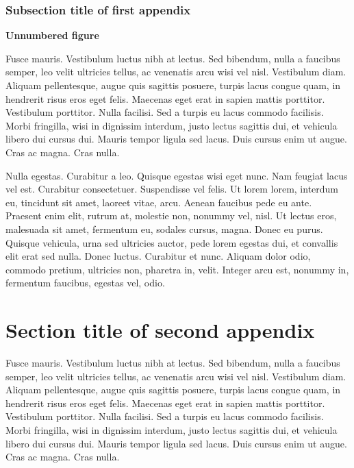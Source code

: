\documentclass[AMA]{WileyNJD-v1}
\begin{document}
\subsubsection{Subsection title of first appendix\label{app1.1.1a}}

\noindent\textbf{Unnumbered figure}


\begin{center}
\end{center}


Fusce mauris. Vestibulum luctus nibh at lectus. Sed bibendum, nulla a faucibus semper, leo velit ultricies tellus, ac
venenatis arcu wisi vel nisl. Vestibulum diam. Aliquam pellentesque, augue quis sagittis posuere, turpis lacus congue
quam, in hendrerit risus eros eget felis. Maecenas eget erat in sapien mattis porttitor. Vestibulum porttitor. Nulla
facilisi. Sed a turpis eu lacus commodo facilisis. Morbi fringilla, wisi in dignissim interdum, justo lectus sagittis dui, et
vehicula libero dui cursus dui. Mauris tempor ligula sed lacus. Duis cursus enim ut augue. Cras ac magna. Cras nulla.

Nulla egestas. Curabitur a leo. Quisque egestas wisi eget nunc. Nam feugiat lacus vel est. Curabitur consectetuer.
Suspendisse vel felis. Ut lorem lorem, interdum eu, tincidunt sit amet, laoreet vitae, arcu. Aenean faucibus pede eu
ante. Praesent enim elit, rutrum at, molestie non, nonummy vel, nisl. Ut lectus eros, malesuada sit amet, fermentum
eu, sodales cursus, magna. Donec eu purus. Quisque vehicula, urna sed ultricies auctor, pede lorem egestas dui, et
convallis elit erat sed nulla. Donec luctus. Curabitur et nunc. Aliquam dolor odio, commodo pretium, ultricies non,
pharetra in, velit. Integer arcu est, nonummy in, fermentum faucibus, egestas vel, odio.

\section{Section title of second appendix\label{app2}}%

Fusce mauris. Vestibulum luctus nibh at lectus. Sed bibendum, nulla a faucibus semper, leo velit ultricies tellus, ac
venenatis arcu wisi vel nisl. Vestibulum diam. Aliquam pellentesque, augue quis sagittis posuere, turpis lacus congue
quam, in hendrerit risus eros eget felis. Maecenas eget erat in sapien mattis porttitor. Vestibulum porttitor. Nulla
facilisi. Sed a turpis eu lacus commodo facilisis. Morbi fringilla, wisi in dignissim interdum, justo lectus sagittis dui, et
vehicula libero dui cursus dui. Mauris tempor ligula sed lacus. Duis cursus enim ut augue. Cras ac magna. Cras nulla.
\end{document}
